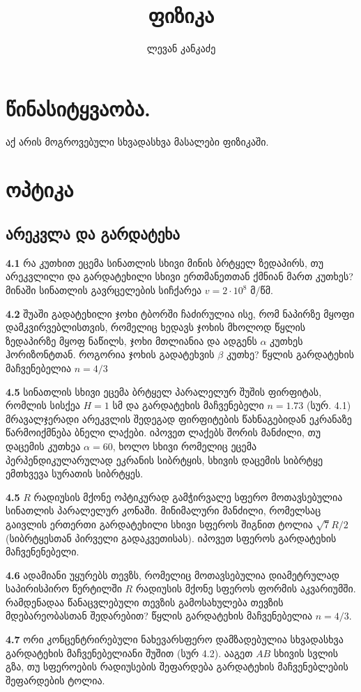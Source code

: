 \documentclass[a4paper]{book}
\title{ფიზიკა}
\author{ლევან კანკაძე}
\begin{document}
\maketitle

\tableofcontents

\chapter{წინასიტყვაობა.}
აქ არის მოგროვებული სხვადასხვა მასალები ფიზიკაში.

\chapter{ოპტიკა}
\section{არეკვლა და გარდატეხა}
\qquad \textbf{4.1} რა კუთხით ეცემა სინათლის სხივი მინის ბრტყელ ზედაპირს, თუ არეკვლილი და გარდატეხილი სხივი ერთმანეთთან ქმნიან მართ კუთხეს? მინაში სინათლის გავრცელების სიჩქარეა $v = 2 \cdot 10^8$ მ/წმ.

\textbf{4.2} შუაში გადატეხილი ჯოხი ტბორში ჩაძირულია ისე, რომ ნაპირზე მყოფი დამკვირვებლისთვის, რომელიც ხედავს ჯოხის მხოლოდ წყლის ზედაპირზე მყოფ ნაწილს, ჯოხი მთლიანია და ადგენს $\alpha$ კუთხეს ჰორიზონტთან. როგორია ჯოხის გადატეხვის $\beta$ კუთხე? წყლის გარდატეხის მაჩვენებელია $n = 4/3$

\textbf{4.5} სინათლის სხივი ეცემა ბრტყელ პარალელურ შუშის ფირფიტას, რომლის სისქეა $H=1$ სმ და გარდატეხის მაჩვენებელი $n=1.73$ (სურ. 4.1) მრავალჯერადი არეკვლის შედეგად ფირფიტების წახნაგებიდან ეკრანაზე წარმოიქმნება ბნელი ლაქები. იპოვეთ ლაქებს შორის მანძილი, თუ დაცემის კუთხეა $\alpha=60$, ხოლო სხივი რომელიც ეცემა პერპენდიკულარულად ეკრანის სიბრტყის, სხივის დაცემის სიბრტყე ემთხვევა სურათის სიბრტყეს.  

\textbf{4.5}
$R$ რადიუსის მქონე ოპტიკურად გამჭირვალე სფერო მოთავსებულია სინათლის პარალელურ კონაში. მინიმალური 
მანძილი, რომელსაც გაივლის ერთერთი გარდატეხილი სხივი სფეროს შიგნით ტოლია $\sqrt{7}R/2$ (სიბრტყესთან პირველი გადაკვეთისას). იპოვეთ სფეროს გარდატეხის მაჩვენენებელი.

\textbf{4.6} ადამიანი უყურებს თევზს, რომელიც მოთავსებულია დიამეტრულად საპირისპირო წერტილში $R$ რადიუსის მქონე სფეროს ფორმის აკვარიუმში. რამდენადაა წანაცვლებული თევზის გამოსახულება თევზის მდებარეობასთან შედარებით? წყლის გარდატეხის მაჩვენებელია $n = 4/3$.

\textbf{4.7} ორი კონცენტრირებული ნახევარსფერო დამზადებულია სხვადასხვა გარდატეხის მაჩვენებელიანი შუშით (სურ 4.2). ააგეთ $AB$ სხივის სვლის გზა, თუ სფეროების რადიუსების შეფარდება გარდატეხის მაჩვენებლების შეფარდების ტოლია.
\end{document}
